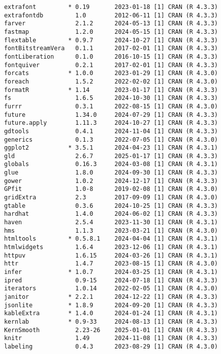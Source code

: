 \documentclass[
]{article}
\begin{document}
\begin{verbatim}
 extrafont         * 0.19       2023-01-18 [1] CRAN (R 4.3.3)
 extrafontdb         1.0        2012-06-11 [1] CRAN (R 4.3.3)
 farver              2.1.2      2024-05-13 [1] CRAN (R 4.3.3)
 fastmap             1.2.0      2024-05-15 [1] CRAN (R 4.3.3)
 flextable         * 0.9.7      2024-10-27 [1] CRAN (R 4.3.3)
 fontBitstreamVera   0.1.1      2017-02-01 [1] CRAN (R 4.3.3)
 fontLiberation      0.1.0      2016-10-15 [1] CRAN (R 4.3.3)
 fontquiver          0.2.1      2017-02-01 [1] CRAN (R 4.3.3)
 forcats           * 1.0.0      2023-01-29 [1] CRAN (R 4.3.0)
 foreach             1.5.2      2022-02-02 [1] CRAN (R 4.3.0)
 formatR           * 1.14       2023-01-17 [1] CRAN (R 4.3.3)
 fs                  1.6.5      2024-10-30 [1] CRAN (R 4.3.3)
 furrr               0.3.1      2022-08-15 [1] CRAN (R 4.3.0)
 future              1.34.0     2024-07-29 [1] CRAN (R 4.3.3)
 future.apply        1.11.3     2024-10-27 [1] CRAN (R 4.3.3)
 gdtools             0.4.1      2024-11-04 [1] CRAN (R 4.3.3)
 generics            0.1.3      2022-07-05 [1] CRAN (R 4.3.0)
 ggplot2           * 3.5.1      2024-04-23 [1] CRAN (R 4.3.1)
 gld                 2.6.7      2025-01-17 [1] CRAN (R 4.3.3)
 globals             0.16.3     2024-03-08 [1] CRAN (R 4.3.1)
 glue                1.8.0      2024-09-30 [1] CRAN (R 4.3.3)
 gower               1.0.2      2024-12-17 [1] CRAN (R 4.3.3)
 GPfit               1.0-8      2019-02-08 [1] CRAN (R 4.3.0)
 gridExtra           2.3        2017-09-09 [1] CRAN (R 4.3.0)
 gtable              0.3.6      2024-10-25 [1] CRAN (R 4.3.3)
 hardhat             1.4.0      2024-06-02 [1] CRAN (R 4.3.3)
 haven               2.5.4      2023-11-30 [1] CRAN (R 4.3.1)
 hms                 1.1.3      2023-03-21 [1] CRAN (R 4.3.0)
 htmltools         * 0.5.8.1    2024-04-04 [1] CRAN (R 4.3.1)
 htmlwidgets         1.6.4      2023-12-06 [1] CRAN (R 4.3.1)
 httpuv              1.6.15     2024-03-26 [1] CRAN (R 4.3.1)
 httr                1.4.7      2023-08-15 [1] CRAN (R 4.3.0)
 infer             * 1.0.7      2024-03-25 [1] CRAN (R 4.3.1)
 ipred               0.9-15     2024-07-18 [1] CRAN (R 4.3.3)
 iterators           1.0.14     2022-02-05 [1] CRAN (R 4.3.0)
 janitor           * 2.2.1      2024-12-22 [1] CRAN (R 4.3.3)
 jsonlite          * 1.8.9      2024-09-20 [1] CRAN (R 4.3.3)
 kableExtra        * 1.4.0      2024-01-24 [1] CRAN (R 4.3.1)
 kernlab           * 0.9-33     2024-08-13 [1] CRAN (R 4.3.3)
 KernSmooth          2.23-26    2025-01-01 [1] CRAN (R 4.3.3)
 knitr               1.49       2024-11-08 [1] CRAN (R 4.3.3)
 labeling            0.4.3      2023-08-29 [1] CRAN (R 4.3.0)

\end{verbatim}
\end{document}
